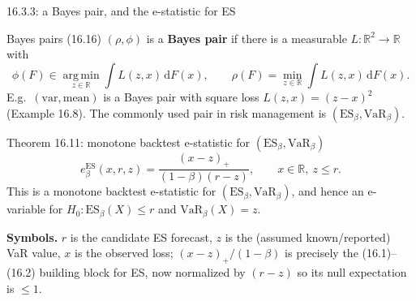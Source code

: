 \documentclass[aspectratio=169,10pt]{beamer}
\newcommand{\RR}{\mathbb{R}}
\newcommand{\1}{\mathbb{1}}
\begin{document}
\begin{frame}{16.3.3: a Bayes pair, and the e-statistic for ES}

\begin{block}{Bayes pairs (16.16)}
$(\rho,\phi)$ is a \textbf{Bayes pair} if there is a measurable $L: \RR^2 \to \RR$ with
\[
\phi(F) \in \operatorname*{arg\,min}_{z\in\RR} \int L(z,x)\,\mathrm dF(x), \qquad \rho(F) = \min_{z\in\RR}\int L(z,x)\,\mathrm dF(x).
\]
E.g.\ $(\mathrm{var},\mathrm{mean})$ is a Bayes pair with square loss $L(z,x)=(z-x)^2$ (Example 16.8). The commonly used pair in risk management is $(\mathrm{ES}_\beta, \mathrm{VaR}_\beta)$.
\end{block}

\begin{block}{Theorem 16.11: monotone backtest e-statistic for $(\mathrm{ES}_\beta,\mathrm{VaR}_\beta)$}
\[
e^{\mathrm{ES}}_\beta(x,r,z) = \frac{(x-z)_+}{(1-\beta)(r-z)}, \qquad x \in \RR,\ z \le r.
\]
This is a monotone backtest e-statistic for $(\mathrm{ES}_\beta,\mathrm{VaR}_\beta)$, and hence an e-variable for $H_0: \mathrm{ES}_\beta(X)\le r$ and $\mathrm{VaR}_\beta(X)=z$.
\end{block}

\textbf{Symbols.} $r$ is the candidate ES forecast, $z$ is the (assumed known/reported) VaR value, $x$ is the observed loss; $(x-z)_+/(1-\beta)$ is precisely the (16.1)--(16.2) building block for ES, now normalized by $(r-z)$ so its null expectation is $\le 1$.

\end{frame}
\end{document}

